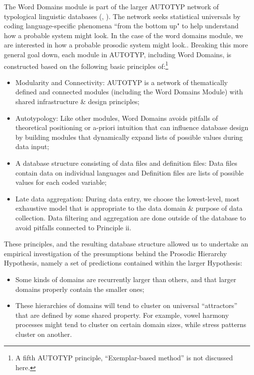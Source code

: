 \documentclass[output=paper]{langscibook}
\begin{document}
The Word Domains module is part of the larger AUTOTYP network of typological linguistic databases (\citealt{bickel_balthasar_autotyp_2017}, \citealt{witzlack2022managing}). The network seeks statistical universals by coding language-specific phenomena ``from the bottom up" to help understand how a probable system might look. In the case of the word domains module, we are interested in how a probable prosodic system might look.. Breaking this more general goal down, each module in AUTOTYP, including Word Domains, is constructed based on the following basic principles of:\footnote{A fifth AUTOTYP principle, “Exemplar-based method” is not discussed here.}

\begin{itemize}
\item 
Modularity and Connectivity: AUTOTYP is a network of thematically defined and connected modules (including the Word Domains Module) with shared infrastructure \& design principles;

\item 
Autotypology: Like other modules, Word Domains avoids pitfalls of theoretical positioning or a-priori intuition that can influence database design by building modules that dynamically expand lists of possible values during data input;

\item 
A database structure consisting of data files and definition files: Data files contain data on individual languages and Definition files are lists of possible values for each coded variable;

\item 
Late data aggregation: During data entry, we choose the lowest-level, most exhaustive model that is appropriate to the data domain \& purpose of data collection. Data filtering and aggregation are done outside of the database to avoid pitfalls connected to Principle ii.

\end{itemize}

These principles, and the resulting database structure allowed us to undertake an empirical investigation of the presumptions behind the Prosodic Hierarchy Hypothesis, namely a set of predictions contained within the larger Hypothesis:

\begin{itemize}
\item 
Some kinds of domains are recurrently larger than others, and that larger domains properly contain the smaller ones;

\item 
These hierarchies of domains will tend to cluster on universal “attractors” that are defined by some shared property. For example, vowel harmony processes might tend to cluster on certain domain sizes, while stress patterns cluster on another.

\end{itemize}
\end{document}
